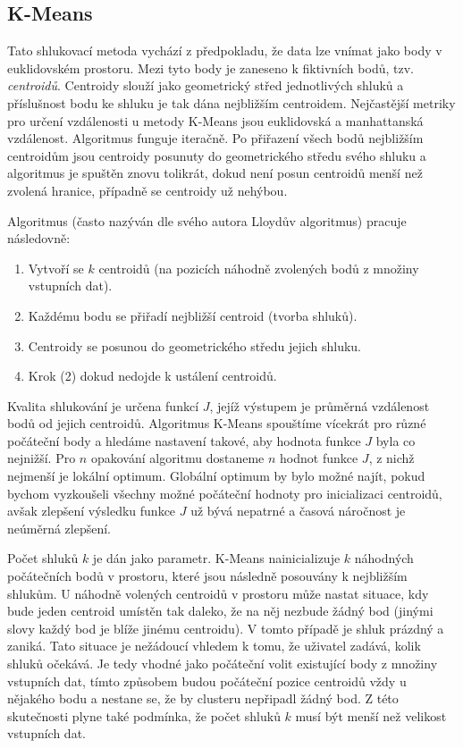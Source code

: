 \documentclass[pdftex,a4paper]{article}
\begin{document}
\subsection{K-Means}
Tato shlukovací metoda vychází z předpokladu, že data lze vnímat jako body v euklidovském prostoru. Mezi tyto body je zaneseno k fiktivních bodů, tzv. \textit{centroidů}. Centroidy slouží jako geometrický střed jednotlivých shluků a příslušnost bodu ke shluku je tak dána nejbližším centroidem. Nejčastější metriky pro určení vzdálenosti u metody K-Means jsou euklidovská a manhattanská vzdálenost. Algoritmus funguje iteračně. Po přiřazení všech bodů nejbližším centroidům jsou centroidy posunuty do geometrického středu svého shluku a algoritmus je spuštěn znovu tolikrát, dokud není posun centroidů menší než zvolená hranice, případně se centroidy už nehýbou. 

Algoritmus (často nazýván dle svého autora Lloydův algoritmus) pracuje následovně:

\begin{enumerate}
	\item Vytvoří se $k$ centroidů (na pozicích náhodně zvolených bodů z množiny vstupních dat).
	\item Každému bodu se přiřadí nejbližší centroid (tvorba shluků).
	\item Centroidy se posunou do geometrického středu jejich shluku.
	\item Krok (2) dokud nedojde k ustálení centroidů.
\end{enumerate}

Kvalita shlukování je určena funkcí $J$, jejíž výstupem je průměrná vzdálenost bodů od jejich centroidů. Algoritmus K-Means spouštíme vícekrát pro různé počáteční body a hledáme nastavení takové, aby hodnota funkce $J$ byla co nejnižší. Pro $n$ opakování algoritmu dostaneme $n$ hodnot funkce $J$, z nichž nejmenší je lokální optimum. Globální optimum by bylo možné najít, pokud bychom vyzkoušeli všechny možné počáteční hodnoty pro inicializaci centroidů, avšak zlepšení výsledku funkce $J$ už bývá nepatrné a časová náročnost je neúměrná zlepšení.

Počet shluků $k$ je dán jako parametr. K-Means nainicializuje $k$ náhodných počátečních bodů v prostoru, které jsou následně posouvány k nejbližším shlukům. U náhodně volených centroidů v prostoru může nastat situace, kdy bude jeden centroid umístěn tak daleko, že na něj nezbude žádný bod (jinými slovy každý bod je blíže jinému centroidu). V tomto případě je shluk prázdný a zaniká. Tato situace je nežádoucí vhledem k tomu, že uživatel zadává, kolik shluků očekává. Je tedy vhodné jako počáteční volit existující body z množiny vstupních dat, tímto způsobem budou počáteční pozice centroidů vždy u nějakého bodu a nestane se, že by clusteru nepřipadl žádný bod. Z této skutečnosti plyne také podmínka, že počet shluků $k$ musí být menší než velikost vstupních dat.
\end{document}
